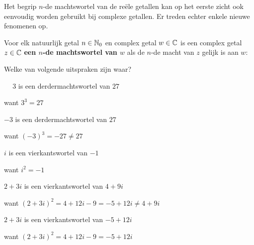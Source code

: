 \documentclass{ximera}
\begin{document}
    \author{Wim Obbels}
    \label{xim:complexe_machtswortels}

    \providecommand{\fm}{\phantom{-}}
    \renewcommand{\fm}{\phantom{-}}

    Het begrip $n$-de machtswortel van de reële getallen kan op het eerste zicht ook eenvoudig worden gebruikt bij complexe getallen. 
    Er treden echter enkele nieuwe fenomenen op.

    \begin{definition}\nl

    Voor elk natuurlijk getal $n\in \mathbb{N}_0$ en complex getal $w\in\mathbb{C}$ is een complex getal $z\in\mathbb{C}$ \textbf{een $n$-de machtswortel van $w$}  als de $n$-de macht van $z$ gelijk is aan $w$:
 

    \end{definition}



    \begin{example} Welke van volgende uitspraken zijn waar?
        \begin{question} 
            \choiceTrue  $\fm3$ is een derdermachtswortel van $27$
            \begin{feedback} want $3^3 = 27$\end{feedback}
        \end{question}
        \begin{question} 
            \choiceFalse  $-3$ is een derdermachtswortel van $27$
            \begin{feedback} want $(-3)^3 = -27 \neq 27 $\end{feedback}
        \end{question}
        \begin{question} 
            \choiceTrue  $i$ is een vierkantswortel van $-1$
            \begin{feedback} want $i^2= -1$\end{feedback}
        \end{question}
        \begin{question} 
            \choiceFalse  $2+3i$ is een vierkantswortel van $4+9i$
            \begin{feedback} want $(2+3i)^2 = 4 + 12i - 9 = -5+12i \neq 4+9i$\end{feedback}
        \end{question}
        \begin{question} 
            \choiceTrue  $2+3i$ is een vierkantswortel van $-5+12i$
            \begin{feedback} want $(2+3i)^2 = 4 + 12i - 9 = -5+12i$\end{feedback}
        \end{question}

    \end{example}
\end{document}
